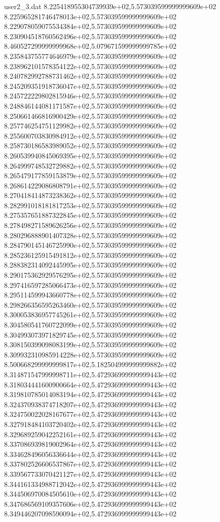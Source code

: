 \begin{filecontents}{user2_3.dat}
8.225418955304739939e+02,5.573039599999999609e+02
8.225965281746478013e+02,5.573039599999999609e+02
8.229078059075534384e+02,5.573039599999999609e+02
8.230904518760562496e+02,5.573039599999999609e+02
8.460527299999999968e+02,5.079671599999999785e+02
8.235843755774646979e+02,5.573039599999999609e+02
8.238962101578354122e+02,5.573039599999999609e+02
8.240782992788731462e+02,5.573039599999999609e+02
8.245209351918736047e+02,5.573039599999999609e+02
8.245722229802815946e+02,5.573039599999999609e+02
8.248846144081171587e+02,5.573039599999999609e+02
8.250661466816900429e+02,5.573039599999999609e+02
8.257746254751129982e+02,5.573039599999999609e+02
8.255600703830984912e+02,5.573039599999999609e+02
8.258730186583989052e+02,5.573039599999999609e+02
8.260539940845069395e+02,5.573039599999999609e+02
8.264999748532729882e+02,5.573039599999999609e+02
8.265479177859153879e+02,5.573039599999999609e+02
8.268614229086808791e+02,5.573039599999999609e+02
8.270418414873238362e+02,5.573039599999999609e+02
8.282991018181817253e+02,5.573039599999999609e+02
8.275357651887322845e+02,5.573039599999999609e+02
8.278498271589626256e+02,5.573039599999999609e+02
8.280296888901407328e+02,5.573039599999999609e+02
8.284790145146725990e+02,5.573039599999999609e+02
8.285236125915491812e+02,5.573039599999999609e+02
8.288382314092445995e+02,5.573039599999999609e+02
8.290175362929576295e+02,5.573039599999999609e+02
8.297416597285066473e+02,5.573039599999999609e+02
8.295114599943660778e+02,5.573039599999999609e+02
8.298266356595263460e+02,5.573039599999999609e+02
8.300053836957745261e+02,5.573039599999999609e+02
8.304580541760722099e+02,5.573039599999999609e+02
8.304993073971829745e+02,5.573039599999999609e+02
8.308150399098083199e+02,5.573039599999999609e+02
8.309932310985914228e+02,5.573039599999999609e+02
8.500668299999999817e+02,5.182504999999999882e+02
8.314871547999998711e+02,5.472936999999999443e+02
8.318034441600900664e+02,5.472936999999999443e+02
8.319810785014083194e+02,5.472936999999999443e+02
8.324370938374718207e+02,5.472936999999999443e+02
8.324750022028167677e+02,5.472936999999999443e+02
8.327918484103720402e+02,5.472936999999999443e+02
8.329689259042252161e+02,5.472936999999999443e+02
8.337086939819002964e+02,5.472936999999999443e+02
8.334628496056336644e+02,5.472936999999999443e+02
8.337802526606537867e+02,5.472936999999999443e+02
8.339567733070421127e+02,5.472936999999999443e+02
8.344161334988712042e+02,5.472936999999999443e+02
8.344506970084505610e+02,5.472936999999999443e+02
8.347686569109357606e+02,5.472936999999999443e+02
8.349446207098590094e+02,5.472936999999999443e+02

\end{filecontents}
